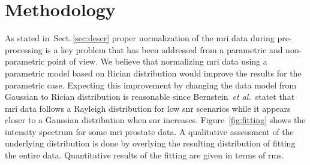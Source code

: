 \section{Methodology}
\label{sec:method}
\graphicspath{ {./content/method/figures/} }


As stated in~Sect.\,\ref{sec:descr} proper normalization of the \ac{mri} data during pre-processing is a key problem that has been addressed from a parametric and non-parametric point of view.
We believe that normalizing \ac{mri} data using a parametric model based on Rician distribution would improve the results for the parametric case.
Expecting this improvement by changing the data model from Gaussian to Rician distribution is reasonable since Bernstein~\emph{et al.}\,\cite{bernstein1989improved} statet that \ac{mri} data follows a Rayleigh distribution for low \ac{snr} scenarios while it appears closer to a Gaussian distribution when \ac{snr} increases.
Figure~\ref{fig:fitting} shows the intensity spectrum for some \ac{mri} prostate data.
A qualitative assessment of the underlying distribution is done by overlying the resulting distribution of fitting the entire data.
Quantitative results of the fitting are given in terms of \ac{rms}.

\begin{figure*}
  \centering
  \subfloat[][]{
    \label{fig:p1}\texttt{[image: 03]}}\hfill
  \subfloat[][]{
    \label{fig:p2}\texttt{[image: 06]}}\hfill
  \subfloat[][]{
    \label{fig:p3}\texttt{[image: 14]}}
  \caption{Visual evaluation of the goodness of fitting using Rician and Gaussian distribution.}
  \label{fig:fitting}
\end{figure*}



